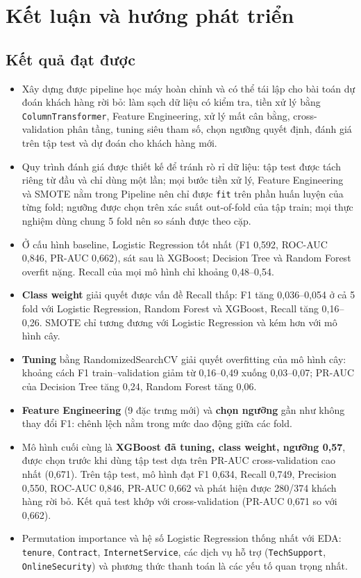 \section{Kết luận và hướng phát triển}

\subsection{Kết quả đạt được}
\begin{itemize}
    \item Xây dựng được pipeline học máy hoàn chỉnh và có thể tái lập cho bài toán dự đoán khách hàng rời bỏ: làm sạch dữ liệu có kiểm tra, tiền xử lý bằng \texttt{ColumnTransformer}, Feature Engineering, xử lý mất cân bằng, cross-validation phân tầng, tuning siêu tham số, chọn ngưỡng quyết định, đánh giá trên tập test và dự đoán cho khách hàng mới.
    \item Quy trình đánh giá được thiết kế để tránh rò rỉ dữ liệu: tập test được tách riêng từ đầu và chỉ dùng một lần; mọi bước tiền xử lý, Feature Engineering và SMOTE nằm trong Pipeline nên chỉ được \texttt{fit} trên phần huấn luyện của từng fold; ngưỡng được chọn trên xác suất out-of-fold của tập train; mọi thực nghiệm dùng chung 5 fold nên so sánh được theo cặp.
    \item Ở cấu hình baseline, Logistic Regression tốt nhất (F1 0,592, ROC-AUC 0,846, PR-AUC 0,662), sát sau là XGBoost; Decision Tree và Random Forest overfit nặng. Recall của mọi mô hình chỉ khoảng 0,48--0,54.
    \item \textbf{Class weight} giải quyết được vấn đề Recall thấp: F1 tăng 0,036--0,054 ở cả 5 fold với Logistic Regression, Random Forest và XGBoost, Recall tăng 0,16--0,26. SMOTE chỉ tương đương với Logistic Regression và kém hơn với mô hình cây.
    \item \textbf{Tuning} bằng RandomizedSearchCV giải quyết overfitting của mô hình cây: khoảng cách F1 train--validation giảm từ 0,16--0,49 xuống 0,03--0,07; PR-AUC của Decision Tree tăng 0,24, Random Forest tăng 0,06.
    \item \textbf{Feature Engineering} (9 đặc trưng mới) và \textbf{chọn ngưỡng} gần như không thay đổi F1: chênh lệch nằm trong mức dao động giữa các fold.
    \item Mô hình cuối cùng là \textbf{XGBoost đã tuning, class weight, ngưỡng 0,57}, được chọn trước khi dùng tập test dựa trên PR-AUC cross-validation cao nhất (0,671). Trên tập test, mô hình đạt F1 0,634, Recall 0,749, Precision 0,550, ROC-AUC 0,846, PR-AUC 0,662 và phát hiện được 280/374 khách hàng rời bỏ. Kết quả test khớp với cross-validation (PR-AUC 0,671 so với 0,662).
    \item Permutation importance và hệ số Logistic Regression thống nhất với EDA: \texttt{tenure}, \texttt{Contract}, \texttt{InternetService}, các dịch vụ hỗ trợ (\texttt{TechSupport}, \texttt{OnlineSecurity}) và phương thức thanh toán là các yếu tố quan trọng nhất.
\end{itemize}

